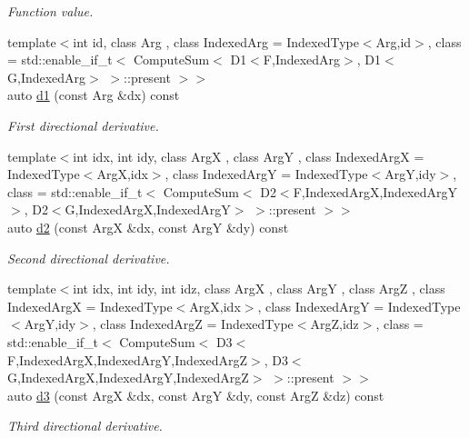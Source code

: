 \begin{DoxyCompactItemize}
\begin{DoxyCompactList}\small\item\em Function value. \end{DoxyCompactList}\item 
{\footnotesize template$<$int id, class Arg , class Indexed\-Arg  = Indexed\-Type$<$\-Arg,id$>$, class  = std\-::enable\-\_\-if\-\_\-t$<$ Compute\-Sum$<$ D1$<$\-F,\-Indexed\-Arg$>$, D1$<$\-G,\-Indexed\-Arg$>$ $>$\-::present $>$$>$ }\\auto \hyperlink{structRFFGen_1_1MathematicalOperations_1_1Sum_a10c105fc333d2663a28699bcba0b087a}{d1} (const Arg \&dx) const 
\begin{DoxyCompactList}\small\item\em First directional derivative. \end{DoxyCompactList}\item 
{\footnotesize template$<$int idx, int idy, class Arg\-X , class Arg\-Y , class Indexed\-Arg\-X  = Indexed\-Type$<$\-Arg\-X,idx$>$, class Indexed\-Arg\-Y  = Indexed\-Type$<$\-Arg\-Y,idy$>$, class  = std\-::enable\-\_\-if\-\_\-t$<$ Compute\-Sum$<$ D2$<$\-F,\-Indexed\-Arg\-X,\-Indexed\-Arg\-Y$>$, D2$<$\-G,\-Indexed\-Arg\-X,\-Indexed\-Arg\-Y$>$ $>$\-::present $>$$>$ }\\auto \hyperlink{structRFFGen_1_1MathematicalOperations_1_1Sum_a227ae4c1437e245f9a25199fb03c0f08}{d2} (const Arg\-X \&dx, const Arg\-Y \&dy) const 
\begin{DoxyCompactList}\small\item\em Second directional derivative. \end{DoxyCompactList}\item 
{\footnotesize template$<$int idx, int idy, int idz, class Arg\-X , class Arg\-Y , class Arg\-Z , class Indexed\-Arg\-X  = Indexed\-Type$<$\-Arg\-X,idx$>$, class Indexed\-Arg\-Y  = Indexed\-Type$<$\-Arg\-Y,idy$>$, class Indexed\-Arg\-Z  = Indexed\-Type$<$\-Arg\-Z,idz$>$, class  = std\-::enable\-\_\-if\-\_\-t$<$ Compute\-Sum$<$ D3$<$\-F,\-Indexed\-Arg\-X,\-Indexed\-Arg\-Y,\-Indexed\-Arg\-Z$>$, D3$<$\-G,\-Indexed\-Arg\-X,\-Indexed\-Arg\-Y,\-Indexed\-Arg\-Z$>$ $>$\-::present $>$$>$ }\\auto \hyperlink{structRFFGen_1_1MathematicalOperations_1_1Sum_a797e6bd471d4bc155fb710e78272c313}{d3} (const Arg\-X \&dx, const Arg\-Y \&dy, const Arg\-Z \&dz) const 
\begin{DoxyCompactList}\small\item\em Third directional derivative. \end{DoxyCompactList}\end{DoxyCompactItemize}


